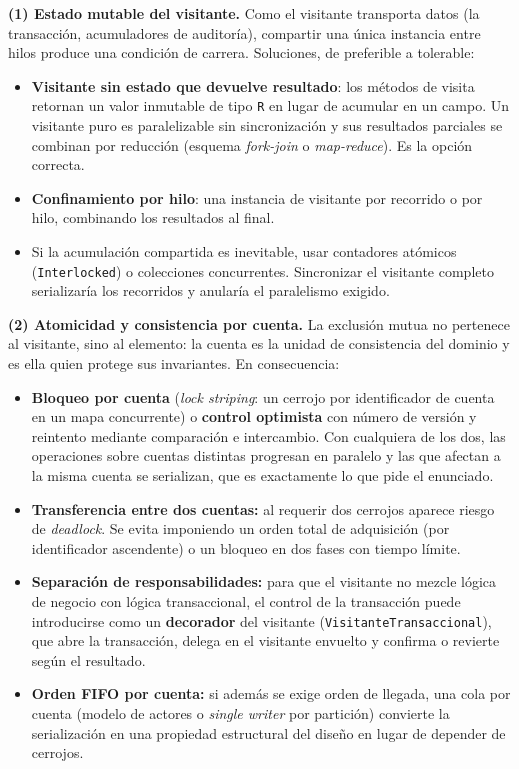 \textbf{(1) Estado mutable del visitante.} Como el visitante transporta datos (la transacción,
acumuladores de auditoría), compartir una única instancia entre hilos produce una condición de
carrera. Soluciones, de preferible a tolerable:

\begin{itemize}[leftmargin=1.2cm]
    \item \textbf{Visitante sin estado que devuelve resultado}: los métodos de visita retornan
          un valor inmutable de tipo \texttt{R} en lugar de acumular en un campo. Un visitante
          puro es paralelizable sin sincronización y sus resultados parciales se combinan por
          reducción (esquema \textit{fork-join} o \textit{map-reduce}). Es la opción correcta.
    \item \textbf{Confinamiento por hilo}: una instancia de visitante por recorrido o por hilo,
          combinando los resultados al final.
    \item Si la acumulación compartida es inevitable, usar contadores atómicos
          (\texttt{Interlocked}) o colecciones concurrentes. Sincronizar el visitante
          completo serializaría los recorridos y anularía el paralelismo exigido.
\end{itemize}

\textbf{(2) Atomicidad y consistencia por cuenta.} La exclusión mutua no pertenece al
visitante, sino al elemento: la cuenta es la unidad de consistencia del dominio y es ella quien
protege sus invariantes. En consecuencia:

\begin{itemize}[leftmargin=1.2cm]
    \item \textbf{Bloqueo por cuenta} (\textit{lock striping}: un cerrojo por identificador de
          cuenta en un mapa concurrente) o \textbf{control optimista} con número de versión y
          reintento mediante comparación e intercambio. Con cualquiera de los dos, las
          operaciones sobre cuentas distintas progresan en paralelo y las que afectan a la
          misma cuenta se serializan, que es exactamente lo que pide el enunciado.
    \item \textbf{Transferencia entre dos cuentas:} al requerir dos cerrojos aparece riesgo de
          \textit{deadlock}. Se evita imponiendo un orden total de adquisición (por
          identificador ascendente) o un bloqueo en dos fases con tiempo límite.
    \item \textbf{Separación de responsabilidades:} para que el visitante no mezcle lógica de
          negocio con lógica transaccional, el control de la transacción puede introducirse como
          un \textbf{decorador} del visitante (\texttt{VisitanteTransaccional}), que abre la
          transacción, delega en el visitante envuelto y confirma o revierte según el resultado.
    \item \textbf{Orden FIFO por cuenta:} si además se exige orden de llegada, una cola por
          cuenta (modelo de actores o \textit{single writer} por partición) convierte la
          serialización en una propiedad estructural del diseño en lugar de depender de
          cerrojos.
\end{itemize}

